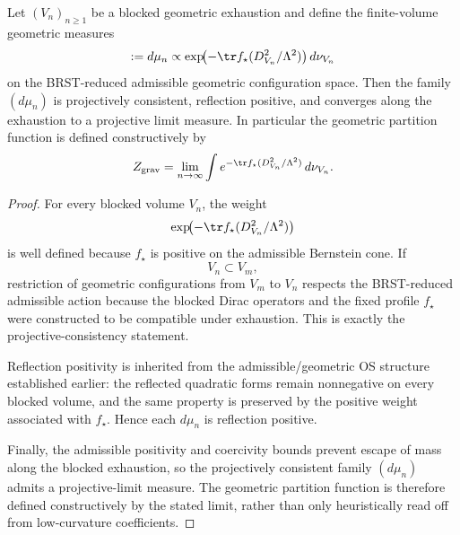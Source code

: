 \begin{theorem}
\label{thm:constructive-geometric-measure}
Let $(V_n)_{n\ge 1}$ be a blocked geometric exhaustion and define the finite-volume geometric
measures
\[
:=
d\mu_n
\propto
\exp\!\bigl(-\tr f_\star(D_{V_n}^2/\Lambda^2)\bigr)\,d\nu_{V_n}
\]
on the BRST-reduced admissible geometric configuration space. Then the family $(d\mu_n)$ is
projectively consistent, reflection positive, and converges along the exhaustion to a projective
limit measure. In particular the geometric partition function is defined constructively by
\[
Z_{\mathrm{grav}}
=
\lim_{n\to\infty}
\int e^{-\tr f_\star(D_{V_n}^2/\Lambda^2)}\,d\nu_{V_n}.
\]
\end{theorem}

\begin{proof}
For every blocked volume $V_n$, the weight
\[
\exp\!\bigl(-\tr f_\star(D_{V_n}^2/\Lambda^2)\bigr)
\]
is well defined because $f_\star$ is positive on the admissible Bernstein cone. If
\[
V_n\subset V_m,
\]
restriction of geometric configurations from $V_m$ to $V_n$ respects the BRST-reduced admissible
action because the blocked Dirac operators and the fixed profile $f_\star$ were constructed to be
compatible under exhaustion. This is exactly the projective-consistency statement.

Reflection positivity is inherited from the admissible/geometric OS structure established earlier:
the reflected quadratic forms remain nonnegative on every blocked volume, and the same property is
preserved by the positive weight associated with $f_\star$. Hence each $d\mu_n$ is reflection
positive.

Finally, the admissible positivity and coercivity bounds prevent escape of mass along the blocked
exhaustion, so the projectively consistent family $(d\mu_n)$ admits a projective-limit measure. The
geometric partition function is therefore defined constructively by the stated limit, rather than
only heuristically read off from low-curvature coefficients.
\end{proof}


